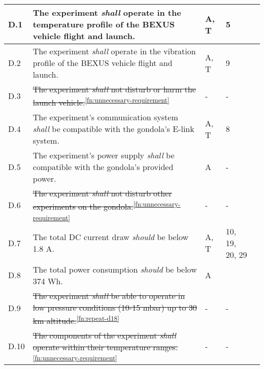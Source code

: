 \begin{longtable}[]{|m{}| m{} |m{} |m{}|m{}|}
D.1  & The experiment \textit{shall} operate in the temperature profile of the BEXUS vehicle flight and launch.                                                                         &       A, T       & 5            &        \\ \hline
D.2  & The experiment \textit{shall} operate in the vibration profile of the BEXUS vehicle flight and launch.                                                                           &       A, T       & 9            &        \\ \hline
D.3  & \st{The experiment \textit{shall} not disturb or harm the launch vehicle.}\textsuperscript{\ref{fn:unnecessary-requirement}}                                                                                                             &      -      & -          &        \\ \hline
D.4  & The experiment's communication system \textit{shall} be compatible with the gondola's E-link system.                                                                             &      A, T        & 8            &        \\ \hline
D.5  & The experiment's power supply \textit{shall
} be compatible with the gondola's provided power.                                                                                    &      A       &  -           &        \\ \hline
D.6  & \st{The experiment \textit{shall} not disturb other experiments on the gondola.}\textsuperscript{\ref{fn:unnecessary-requirement}}                                                                                                       &      -      & -           &        \\ \hline
D.7  & The total DC current draw \textit{should} be below 1.8 A.                                                                                                                        &      A, T        & 10, 19, 20, 29            &        \\ \hline
D.8  & The total power consumption \textit{should} be below 374 Wh.                                                                                                                      &       A       &            &        \\ \hline
D.9  & \st{The experiment \textit{shall} be able to operate in low pressure conditions (10-15 mbar) up to 30 km altitude.}\textsuperscript{\ref{fn:repeat-d18}} &- &  - &        \\ \hline
D.10 & \st{The components of the experiment \textit{shall} operate within their temperature ranges.}\textsuperscript{\ref{fn:unnecessary-requirement}}                                                                                          &       -     & -           &        \\  \hline

\end{longtable}
